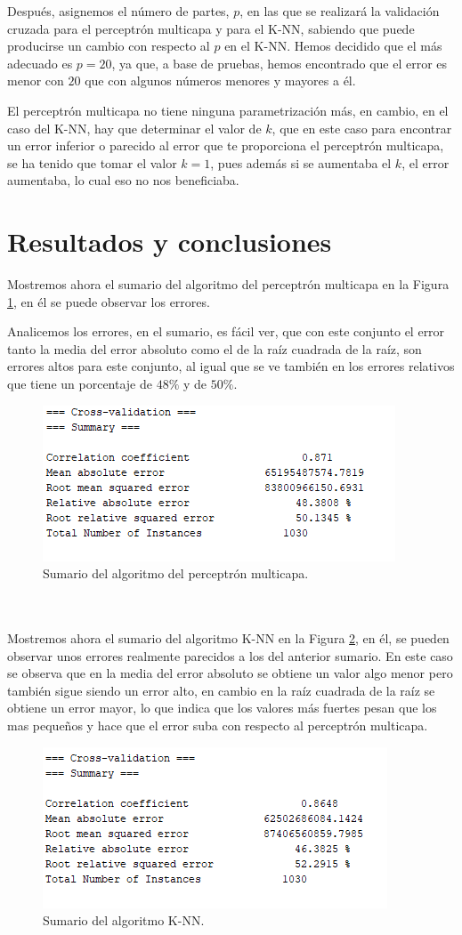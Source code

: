 \documentclass[a4paper, 11pt, twoside, openany, onecolumn, final]{memoir}
\begin{document}
	Después, asignemos el número de partes, $p$, en las que se realizará la validación cruzada para el perceptrón multicapa y para el K-NN, sabiendo que puede producirse un cambio con respecto al $p$ en el K-NN. Hemos decidido que el más adecuado es $p=20$, ya que, a base de pruebas, hemos encontrado que el error es menor con $20$ que con algunos números menores y mayores a él.
	
	El perceptrón multicapa no tiene ninguna parametrización más, en cambio, en el caso del K-NN, hay que determinar el valor de $k$, que en este caso para encontrar un error inferior o parecido al error que te proporciona el perceptrón multicapa, se ha tenido que tomar el valor $k=1$, pues además si se aumentaba el $k$, el error aumentaba, lo cual eso no nos beneficiaba.
	
	\section{Resultados y conclusiones}
	Mostremos ahora el sumario del algoritmo del perceptrón multicapa en la Figura \ref{SumarioPerceptron}, en él se puede observar los errores.
	
	Analicemos los errores, en el sumario, es fácil ver, que con este conjunto el error tanto la media del error absoluto como el de la raíz cuadrada de la raíz, son errores altos para este conjunto, al igual que se ve también en los errores relativos que tiene un porcentaje de $48\%$ y de $50\%$.
	\begin{figure}
  		\centering
   	\includegraphics{Imagenes/SumarioPerceptron}
  		\caption{Sumario del algoritmo del perceptrón multicapa.}
  		\label{SumarioPerceptron}
	\end{figure}
\\	\\
	Mostremos ahora el sumario del algoritmo K-NN en la Figura \ref{SumarioKNN}, en él, se pueden observar unos errores realmente parecidos a los del anterior sumario. En este caso se observa que en la media del error absoluto se obtiene un valor algo menor pero también sigue siendo un error alto, en cambio en la raíz cuadrada de la raíz se obtiene un error mayor, lo que indica que los valores más fuertes pesan que los mas pequeños y hace que el error suba con respecto al perceptrón multicapa.  	 
	
	\begin{figure}
  		\centering
   	\includegraphics{Imagenes/SumarioKNN}
  		\caption{Sumario del algoritmo K-NN.}
  		\label{SumarioKNN}
	\end{figure}	 
	 
\end{document}
